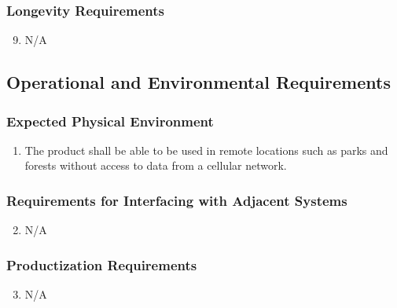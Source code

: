 \documentclass[]{article}
\begin{document}
\subsubsection{Longevity Requirements}
\label{ssub:longevity_requirements}
\begin{enumerate}[{PR}1.]
	\setcounter{enumi}{8}
	\item N/A
\end{enumerate}


\subsection{Operational and Environmental Requirements}
\label{sub:operational_and_environmental_requirements}

\subsubsection{Expected Physical Environment}
\label{ssub:expected_physical_environment}
\begin{enumerate}[{OE}1.]
	\item The product shall be able to be used in remote locations such as parks and forests without access to data from a cellular network.
\end{enumerate}

\subsubsection{Requirements for Interfacing with Adjacent Systems}
\label{ssub:requirements_for_interfacing_with_adjacent_systems}
\begin{enumerate}[{OE}1.]
	\setcounter{enumi}{1}
	\item N/A
\end{enumerate}

\subsubsection{Productization Requirements}
\label{ssub:productization_requirements}
\begin{enumerate}[{OE}1.]
	\setcounter{enumi}{2}
	\item N/A
\end{enumerate}
\end{document}
